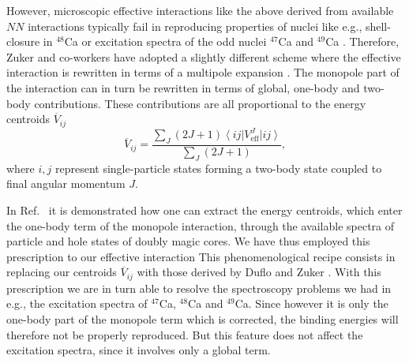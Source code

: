 However, microscopic effective interactions
like the above derived from available $NN$ interactions 
typically fail in reproducing properties of nuclei like 
e.g., shell-closure in $^{48}$Ca or excitation spectra
of the odd nuclei $^{47}$Ca and $^{49}$Ca \cite{hko95}.
Therefore, Zuker and co-workers \cite{zuk94,zuk98} 
have adopted a slightly
different scheme where the effective interaction is 
rewritten in terms of a multipole expansion \cite{zuk94}.
The monopole part of the interaction 
can in turn be rewritten in terms of
global, one-body and two-body contributions. 
These contributions are all proportional
to the energy centroids $\overline{V}_{ij}$
\begin{equation}
     \overline{V}_{ij}=
     \frac{\sum_J (2J+1) \left\langle ij \right | V_{\mathrm{eff}}^J 
     \left | ij \right \rangle}{\sum_J (2J+1)},
\end{equation}
where $i,j$ represent single-particle states
forming a two-body state coupled to final
angular momentum $J$.
 
In Ref.\ \cite{zuk98} it is demonstrated how
one can extract the energy centroids, which enter the 
one-body term of the monopole interaction, through the
available 
spectra of particle
and hole states of doubly magic cores. We have thus employed this
prescription to our effective interaction
This phenomenological recipe consists in replacing
our centroids $\overline{V}_{ij}$ with those 
derived by Duflo and Zuker \cite{zuk98}. 
With this prescription we are in turn able to resolve 
the spectroscopy problems we had in e.g., 
the excitation spectra of $^{47}$Ca, $^{48}$Ca and
$^{49}$Ca. Since however it is only the one-body part
of the monopole term which is corrected, the binding
energies will therefore not be properly reproduced.
But this feature does not affect the excitation spectra,
since it involves only a global term. 






